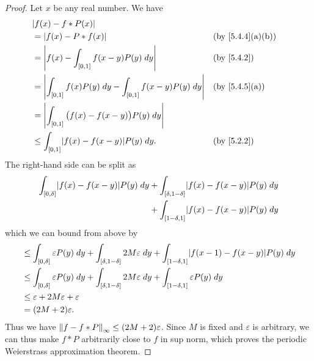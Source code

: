 \begin{proof}
  Let \(x\) be any real number.
  We have
  \begin{align*}
     & \abs{f(x) - f * P(x)}                                                                                         \\
     & = \abs{f(x) - P * f(x)}                                                   &  & \text{(by \cref{5.4.4}(a)(b))} \\
     & = \abs{f(x) - \int_{[0, 1]} f(x - y) P(y) \; dy}                          &  & \by{5.4.2}                     \\
     & = \abs{\int_{[0, 1]} f(x) P(y) \; dy - \int_{[0, 1]} f(x - y) P(y) \; dy} &  & \text{(by \cref{5.4.5}(a))}    \\
     & = \abs{\int_{[0, 1]} \big(f(x) - f(x - y)\big) P(y) \; dy}                                                    \\
     & \leq \int_{[0, 1]} \abs{f(x) - f(x - y)} P(y) \; dy.                      &  & \by{5.2.2}
  \end{align*}
  The right-hand side can be split as
  \begin{align*}
    \int_{[0, \delta]} \abs{f(x) - f(x - y)} P(y) \; dy & + \int_{[\delta, 1 - \delta]} \abs{f(x) - f(x - y)} P(y) \; dy \\
                                                        & + \int_{[1 - \delta, 1]} \abs{f(x) - f(x - y)} P(y) \; dy
  \end{align*}
  which we can bound from above by
  \begin{align*}
     & \leq \int_{[0, \delta]} \varepsilon P(y) \; dy + \int_{[\delta, 1 - \delta]} 2 M \varepsilon \; dy + \int_{[1 - \delta, 1]} \abs{f(x - 1) - f(x - y)} P(y) \; dy \\
     & \leq \int_{[0, \delta]} \varepsilon P(y) \; dy + \int_{[\delta, 1 - \delta]} 2 M \varepsilon \; dy + \int_{[1 - \delta, 1]} \varepsilon P(y) \; dy               \\
     & \leq \varepsilon + 2 M \varepsilon + \varepsilon                                                                                                                 \\
     & = (2M + 2) \varepsilon.
  \end{align*}
  Thus we have \(\norm*{f - f * P}_{\infty} \leq (2M + 2) \varepsilon\).
  Since \(M\) is fixed and \(\varepsilon\) is arbitrary, we can thus make \(f * P\) arbitrarily close to \(f\) in sup norm, which proves the periodic Weierstrass approximation theorem.
\end{proof}

